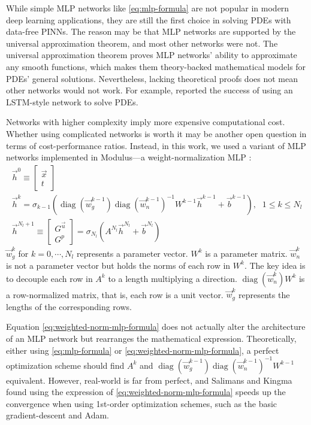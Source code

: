While simple MLP networks like \eqref{eq:mlp-formula} are not popular in modern deep learning applications, they are still the first choice in solving PDEs with data-free PINNs.
The reason may be that MLP networks are supported by the universal approximation theorem, and most other networks were not.
The universal approximation theorem proves MLP networks' ability to approximate any smooth functions, which makes them theory-backed mathematical models for PDEs' general solutions.
Nevertheless, lacking theoretical proofs does not mean other networks would not work.
For example, \cite{sirignano_dgm:_2018} reported the success of using an LSTM-style network to solve PDEs.

Networks with higher complexity imply more expensive computational cost.
Whether using complicated networks is worth it may be another open question in terms of cost-performance ratios. 
Instead, in this work, we used a variant of MLP networks implemented in Modulus---a weight-normalization MLP \cite{salimans_weight_2016}:
\begin{equation}\label{eq:weighted-norm-mlp-formula}
    \begin{array}{ll}
        \vec{h}^0 \equiv \begin{bmatrix} \vec{x} \\ t \end{bmatrix} & \\
        \vec{h}^k = \sigma_{k-1}\left(
            \operatorname{diag}\left(\vec{w}_g^{k-1}\right)
            \operatorname{diag}\left(\vec{w}_n^{k-1}\right)^{-1}
            W^{k-1}\vec{h}^{k-1}+\vec{b}^{k-1}
        \right)\text{,} & 1 \le k \le N_l \\
        \vec{h}^{N_l+1}\equiv \begin{bmatrix} G^{\vec{u}} \\ G^p \end{bmatrix} = \sigma_{N_l}\left(A^{N_l}\vec{h}^{N_l}+\vec{b}^{N_l}\right) &
    \end{array}
\end{equation}
$\vec{w}_g^{k}$ for $k=0,\cdots,N_l$ represents a parameter vector.
$W^k$ is a parameter matrix.
$\vec{w}_n^{k}$ is not a parameter vector but holds the norms of each row in $W^k$.
The key idea is to decouple each row in $A^k$ to a length multiplying a direction.
$\operatorname{diag}\left(\vec{w}_n^k\right)W^k$ is a row-normalized matrix, that is, each row is a unit vector.
$\vec{w}_g^k$ represents the lengths of the corresponding rows.

Equation \eqref{eq:weighted-norm-mlp-formula} does not actually alter the architecture of an MLP network but rearranges the mathematical expression.
Theoretically, either using \eqref{eq:mlp-formula} or \eqref{eq:weighted-norm-mlp-formula}, a perfect optimization scheme should find $A^k$ and $\operatorname{diag}\left(\vec{w}_g^{k-1}\right) \operatorname{diag}\left(\vec{w}_n^{k-1}\right)^{-1} W^{k-1}$ equivalent.
However, real-world is far from perfect, and Salimans and Kingma \cite{salimans_weight_2016} found using the expression of \eqref{eq:weighted-norm-mlp-formula} speeds up the convergence when using 1st-order optimization schemes, such as the basic gradient-descent and Adam.

